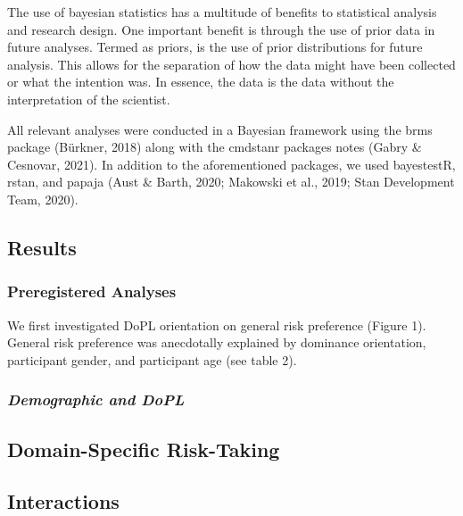 \documentclass[
  donotrepeattitle,doc, 12pt, a4paper,floatsintext]{apa7}
\begin{document}
The use of bayesian statistics has a multitude of benefits to statistical analysis and research design. One important benefit is through the use of prior data in future analyses. Termed as priors, is the use of prior distributions for future analysis. This allows for the separation of how the data might have been collected or what the intention was. In essence, the data is the data without the interpretation of the scientist.

All relevant analyses were conducted in a Bayesian framework using the brms package (Bürkner, 2018) along with the cmdstanr packages notes (Gabry \& Cesnovar, 2021). In addition to the aforementioned packages, we used bayestestR, rstan, and papaja (Aust \& Barth, 2020; Makowski et al., 2019; Stan Development Team, 2020).

\hypertarget{results-3}{%
\subsection{Results}\label{results-3}}

\hypertarget{preregistered-analyses-3}{%
\subsubsection{Preregistered Analyses}\label{preregistered-analyses-3}}

We first investigated DoPL orientation on general risk preference (Figure 1). General risk preference was anecdotally explained by dominance orientation, participant gender, and participant age (see table 2).

\hypertarget{demographic-and-dopl-3}{%
\subsubsection{\texorpdfstring{\emph{Demographic and DoPL}}{Demographic and DoPL}}\label{demographic-and-dopl-3}}

\hypertarget{domain-specific-risk-taking-3}{%
\subsection{Domain-Specific Risk-Taking}\label{domain-specific-risk-taking-3}}

\hypertarget{interactions-3}{%
\subsection{Interactions}\label{interactions-3}}
\end{document}
